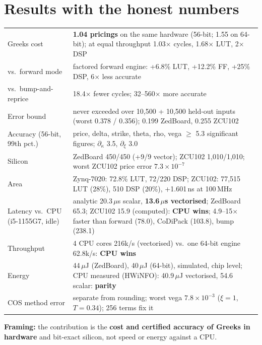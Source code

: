 \documentclass[11pt,a4paper]{article}
\begin{document}
\section{Results with the honest numbers}
\begin{center}\small
\begin{tabular}{@{}L{4.2cm}L{11.2cm}@{}}
\toprule
Greeks cost & \textbf{1.04 pricings} on the same hardware (56-bit; 1.55 on 64-bit); at equal throughput 1.03$\times$ cycles, 1.68$\times$ LUT, 2$\times$ DSP\\
vs.\ forward mode & factored forward engine: +6.8\% LUT, +12.2\% FF, +25\% DSP, 6$\times$ less accurate\\
vs.\ bump-and-reprice & 18.4$\times$ fewer cycles; 32--560$\times$ more accurate\\
Error bound & never exceeded over 10,500 + 10,500 held-out inputs (worst 0.378 / 0.356); 0.199 ZedBoard, 0.255 ZCU102\\
Accuracy (56-bit, 99th pct.) & price, delta, strike, theta, rho, vega $\ge$ 5.3 significant figures; $\partial_\kappa$ 3.5, $\partial_\xi$ 3.0\\
Silicon & ZedBoard 450/450 (+9/9 vector); ZCU102 1,010/1,010; worst ZCU102 price error $7.3\times10^{-7}$\\
Area & Zynq-7020: 72.8\% LUT, 72/220 DSP; ZCU102: 77,515 LUT (28\%), 510 DSP (20\%), +1.601\,ns at 100\,MHz\\
Latency vs.\ CPU (i5-1155G7, idle) & analytic 20.3\,$\mu$s scalar, \textbf{13.6\,$\mu$s vectorised}; ZedBoard 65.3; ZCU102 15.9 (computed): \textbf{CPU wins}; 4.9--15$\times$ faster than forward (78.0), CoDiPack (103.8), bump (238.1)\\
Throughput & 4 CPU cores 216k/s (vectorised) vs.\ one 64-bit engine 62.8k/s: \textbf{CPU wins}\\
Energy & 44\,$\mu$J (ZedBoard), 40\,$\mu$J (64-bit), simulated, chip level; CPU measured (HWiNFO): 40.9\,$\mu$J vectorised, 54.6 scalar: \textbf{parity}\\
COS method error & separate from rounding; worst vega $7.8\times10^{-3}$ ($\xi=1$, $T=0.34$); 256 terms fix it\\
\bottomrule
\end{tabular}
\end{center}
\textbf{Framing:} the contribution is the \textbf{cost and certified accuracy of Greeks in
hardware} and bit-exact silicon, not speed or energy against a CPU.
\end{document}
